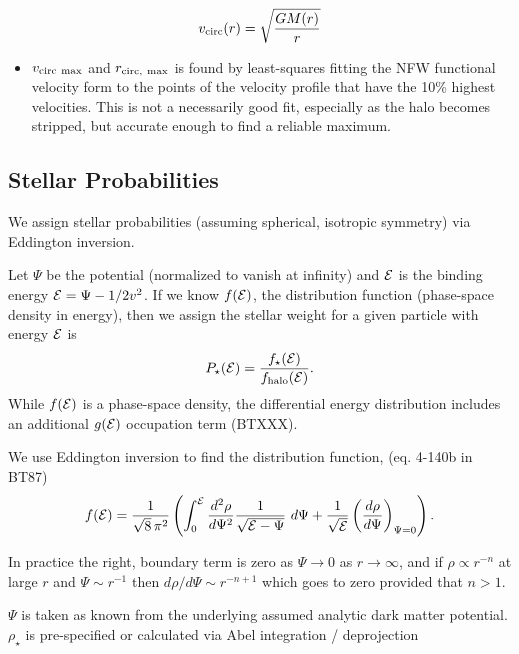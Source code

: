 \begin{equation}{
v_{\rm circ}(r) = \sqrt{\frac{GM(r)}{r}}
}\end{equation}

\begin{itemize}
\tightlist
\item
  \(v_{\rm circ\ max}\) and \(r_{\rm circ,\ max}\) is found by
  least-squares fitting the NFW functional velocity form to the points
  of the velocity profile that have the 10\% highest velocities. This is
  not a necessarily good fit, especially as the halo becomes stripped,
  but accurate enough to find a reliable maximum.
\end{itemize}

\subsection{Stellar Probabilities}\label{stellar-probabilities}

We assign stellar probabilities (assuming spherical, isotropic symmetry)
via Eddington inversion.

Let \(\Psi\) be the potential (normalized to vanish at infinity) and
\({\cal E}\) is the binding energy \({\cal E} = \Psi - 1/2 v^2\). If we
know \(f({\cal E})\), the distribution function (phase-space density in
energy), then we assign the stellar weight for a given particle with
energy \({\cal E}\) is \begin{equation}{
P_\star({\cal E}) = \frac{f_\star({\cal E})}{f_{\rm halo}({\cal E})}.
}\end{equation} While \(f({\cal E})\) is a phase-space density, the
differential energy distribution includes an additional \(g({\cal E})\)
occupation term (BTXXX).

We use Eddington inversion to find the distribution function, (eq.
4-140b in BT87) \begin{equation}{
f({\cal E}) = \frac{1}{\sqrt{8}\, \pi^2}\left( \int_0^{\cal E} \frac{d^2\rho}{d\Psi^2} \frac{1}{\sqrt{{\cal E} - \Psi}}\ d\Psi + \frac{1}{\sqrt{\cal E}} \left(\frac{d\rho}{d\Psi}\right)_{\Psi=0} \right).
}\end{equation}

In practice the right, boundary term is zero as \(\Psi \to 0\) as
\(r\to\infty\), and if \(\rho \propto r^{-n}\) at large \(r\) and
\(\Psi \sim r^{-1}\) then \(d\rho / d\Psi \sim r^{-n+1}\) which goes to
zero provided that \(n > 1\).

\(\Psi\) is taken as known from the underlying assumed analytic dark
matter potential. \(\rho_\star\) is pre-specified or calculated via Abel
integration / deprojection

